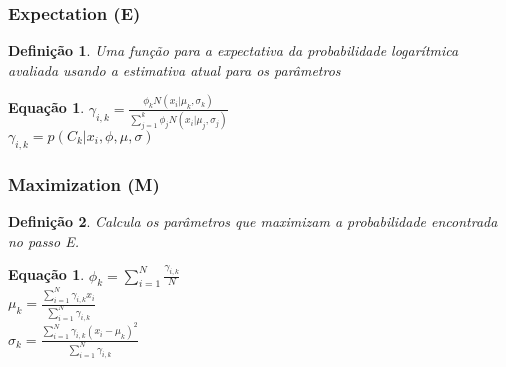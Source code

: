 \documentclass[aspectratio=169]{beamer}
\theoremstyle{Definition}
\newtheorem{defn}{Defini\c c\~ao}
\newtheorem{eq}[theorem]{Equa\c c\~ao}
\begin{document}
\begin{frame}
	\frametitle{Expectation (E)}
	
	\begin{defn}
	 Uma função para a expectativa da probabilidade logarítmica avaliada usando a estimativa atual para os parâmetros
	\end{defn}
	
	\begin{eq}
			$ \gamma_{i,k} = \frac{ \phi_k N(x_i \vert \mu_k,\sigma_k)}{    \sum^k_{j=1}  \phi_j N(x_i \vert \mu_j,\sigma_j) } $ \\
			$ \gamma_{i,k} = p(C_k \vert x_i,\phi,\mu,\sigma) $
	\end{eq}
	
	
\end{frame}


\begin{frame}
	\frametitle{Maximization (M)}
	
	\begin{defn}
		Calcula os parâmetros que maximizam a probabilidade encontrada no passo E.
	\end{defn}
	
	\begin{eq}
			$ \phi_k = \sum^N_{i=1} \frac{\gamma_{i,k}}{N} $ \\
			$ \mu_k = \frac{\sum^N_{i=1} \gamma_{i,k} x_i}{\sum^N_{i=1} \gamma_{i,k}} $ \\
			$ \sigma_k = \frac{\sum^N_{i=1} \gamma_{i,k} (x_i - \mu_k)^2}{\sum^N_{i=1} \gamma_{i,k}} $
	\end{eq}
	
	
\end{frame}


\end{document}
